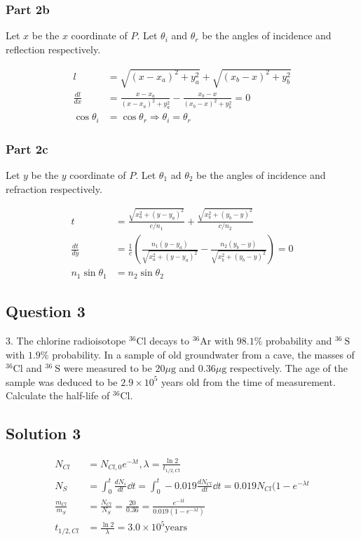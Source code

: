 \documentclass{article}
\begin{document}
\subsubsection{Part 2b}
Let $x$ be the $x$ coordinate of $P$. Let $\theta_i$ and $\theta_r$ be the angles of incidence and reflection respectively. 

\begin{align}
    l &= \sqrt{(x-x_a)^2+y_a^2} + \sqrt{(x_b-x)^2+y_b^2} \\
    \frac{dl}{dx} &= \frac{x-x_a}{(x-x_a)^2+y_a^2} - \frac{x_b-x}{(x_b-x)^2+y_b^2} = 0 \\
    \cos\theta_i &= \cos\theta_r \Rightarrow \theta_i=\theta_r
\end{align}

\subsubsection{Part 2c}
Let $y$ be the $y$ coordinate of $P$. Let $\theta_1$ ad $\theta_2$ be the angles of incidence and refraction respectively.

\begin{align}
    t &= \frac{\sqrt{x_a^2+(y-y_a)^2}}{c/n_1} + \frac{\sqrt{x_b^2+(y_b-y)^2}}{c/n_2} \\
    \frac{dt}{dy} &= \frac{1}{c}\left( \frac{n_1(y-y_a)}{\sqrt{x_a^2+(y-y_a)^2}} - \frac{n_2(y_b-y)}{\sqrt{x_b^2+(y_b-y)^2}}\right) = 0 \\
    n_1 \sin\theta_1 &= n_2 \sin\theta_2
\end{align}

\pagebreak
\subsection{Question 3}
3. The chlorine radioisotope ${ }^{36} \mathrm{Cl}$ decays to ${ }^{36} \mathrm{Ar}$ with $98.1 \%$ probability and ${ }^{36} \mathrm{~S}$ with $1.9 \%$ probability. In a sample of old groundwater from a cave, the masses of ${ }^{36} \mathrm{Cl}$ and ${ }^{36} \mathrm{~S}$ were measured to be $20 \mu \mathrm{g}$ and $0.36 \mu \mathrm{g}$ respectively. The age of the sample was deduced to be $2.9 \times 10^{5}$ years old from the time of measurement. Calculate the half-life of ${ }^{36} \mathrm{Cl}$.

\subsection{Solution 3}
\begin{align}
    N_{Cl} &= N_{Cl, 0} e^{-\lambda t}, \lambda = \frac{\ln 2}{t_{1/2, Cl}}  \\
    N_S &= \int_0^t \frac{dN_s}{dt} \dd{t} = \int_0^t -0.019 \frac{dN_{Cl}}{dt} \dd{t} = 0.019 N_{Cl} (1-e^{-\lambda t} \\
    \frac{m_{Cl}}{m_S} &= \frac{N_{Cl}}{N_S} = \frac{20}{0.36} = \frac{e^{-\lambda t}}{0.019(1-e^{-\lambda t})} \\
    t_{1/2, Cl} &= \frac{\ln 2}{\lambda} = 3.0\times10^5 \mathrm{years}
\end{align}
\end{document}
